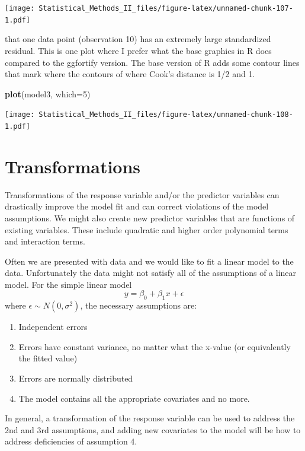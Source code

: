 \documentclass[]{book}
\newenvironment{Shaded}{\begin{snugshade}}{\end{snugshade}}
\newcommand{\KeywordTok}[1]{\textcolor[rgb]{0.13,0.29,0.53}{\textbf{{#1}}}}
\newcommand{\DataTypeTok}[1]{\textcolor[rgb]{0.13,0.29,0.53}{{#1}}}
\newcommand{\DecValTok}[1]{\textcolor[rgb]{0.00,0.00,0.81}{{#1}}}
\newcommand{\NormalTok}[1]{{#1}}
\providecommand{\tightlist}{%
  \setlength{\itemsep}{0pt}\setlength{\parskip}{0pt}}
\theoremstyle{definition}
\theoremstyle{definition}
\theoremstyle{remark}
\begin{document}
\texttt{[image: Statistical\_Methods\_II\_files/figure-latex/unnamed-chunk-107-1.pdf]}

that one data point (observation 10) has an extremely large standardized
residual. This is one plot where I prefer what the base graphics in R
does compared to the ggfortify version. The base version of R adds some
contour lines that mark where the contours of where Cook's distance is
1/2 and 1.

\begin{Shaded}
\begin{Highlighting}[]
\KeywordTok{plot}\NormalTok{(model3, }\DataTypeTok{which=}\DecValTok{5}\NormalTok{)}
\end{Highlighting}
\end{Shaded}

\texttt{[image: Statistical\_Methods\_II\_files/figure-latex/unnamed-chunk-108-1.pdf]}

\section{Transformations}\label{transformations}

Transformations of the response variable and/or the predictor variables
can drastically improve the model fit and can correct violations of the
model assumptions. We might also create new predictor variables that are
functions of existing variables. These include quadratic and higher
order polynomial terms and interaction terms.

Often we are presented with data and we would like to fit a linear model
to the data. Unfortunately the data might not satisfy all of the
assumptions of a linear model. For the simple linear model
\[y=\beta_{0}+\beta_{1}x+\epsilon\] where
\(\epsilon\sim N\left(0,\sigma^{2}\right)\), the necessary assumptions
are:

\begin{enumerate}
\def\labelenumi{\arabic{enumi}.}
\tightlist
\item
  Independent errors
\item
  Errors have constant variance, no matter what the x-value (or
  equivalently the fitted value)
\item
  Errors are normally distributed
\item
  The model contains all the appropriate covariates and no more.
\end{enumerate}

In general, a transformation of the response variable can be used to
address the 2nd and 3rd assumptions, and adding new covariates to the
model will be how to address deficiencies of assumption 4.
\end{document}
